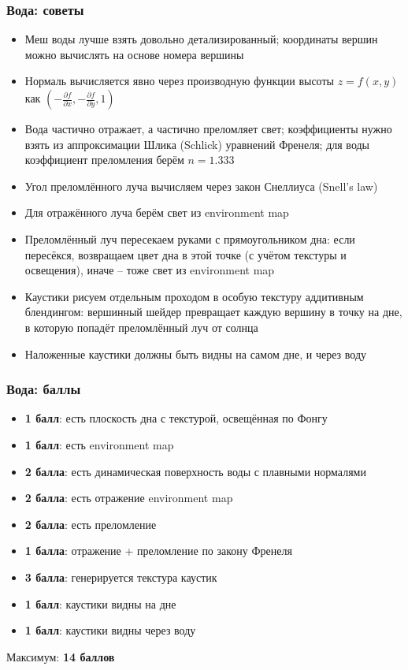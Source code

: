 \documentclass{beamer}
\begin{document}
\begin{frame}[fragile]
\frametitle{Вода: советы}
\fontsize{8pt}{8pt}
\selectfont
\begin{itemize}
\item Меш воды лучше взять довольно детализированный; координаты вершин можно вычислять на основе номера вершины
\item Нормаль вычисляется явно через производную функции высоты \begin{math}z = f(x,y)\end{math} как \begin{math}\left(-\frac{\partial f}{\partial x},-\frac{\partial f}{\partial y}, 1\right)\end{math}
\item Вода частично отражает, а частично преломляет свет; коэффициенты нужно взять из аппроксимации Шлика (Schlick) уравнений Френеля; для воды коэффициент преломления берём \begin{math}n = 1.333\end{math}
\item Угол преломлённого луча вычисляем через закон Снеллиуса (Snell's law)
\item Для отражённого луча берём свет из environment map
\item Преломлённый луч пересекаем руками с прямоугольником дна: если пересёкся, возвращаем цвет дна в этой точке (с учётом текстуры и освещения), иначе -- тоже свет из environment map
\item Каустики рисуем отдельным проходом в особую текстуру аддитивным блендингом: вершинный шейдер превращает каждую вершину в точку на дне, в которую попадёт преломлённый луч от солнца
\item Наложенные каустики должны быть видны на самом дне, и через воду
\end{itemize}
\end{frame}

\begin{frame}[fragile]
\frametitle{Вода: баллы}
\fontsize{8pt}{8pt}
\selectfont
\begin{itemize}
\item \textbf{1 балл}: есть плоскость дна с текстурой, освещённая по Фонгу
\item \textbf{1 балл}: есть environment map
\item \textbf{2 балла}: есть динамическая поверхность воды с плавными нормалями
\item \textbf{2 балла}: есть отражение environment map
\item \textbf{2 балла}: есть преломление
\item \textbf{1 балла}: отражение + преломление по закону Френеля
\item \textbf{3 балла}: генерируется текстура каустик
\item \textbf{1 балл}: каустики видны на дне
\item \textbf{1 балл}: каустики видны через воду
\end{itemize}
Максимум: \textbf{14 баллов}
\end{frame}
\end{document}
